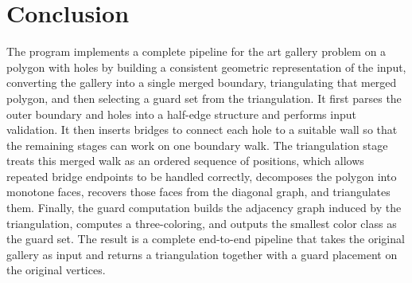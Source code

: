 \documentclass[11pt]{article}
\begin{document}
\section{Conclusion}

The program implements a complete pipeline for the art gallery problem on a polygon with holes by building a consistent geometric representation of the input, converting the gallery into a single merged
boundary, triangulating that merged polygon, and then selecting a guard set from the triangulation. It first parses the outer boundary and holes into a half-edge structure and performs input validation. It
then inserts bridges to connect each hole to a suitable wall so that the remaining stages can work on one boundary walk. The triangulation stage treats this merged walk as an ordered
sequence of positions, which allows repeated bridge endpoints to be handled correctly, decomposes the polygon into monotone faces, recovers those faces from the diagonal graph, and
triangulates them. Finally, the guard computation builds the adjacency graph induced by the triangulation, computes a three-coloring, and outputs the smallest color class as the
guard set. The result is a complete end-to-end pipeline that takes the original gallery as input and returns a triangulation together with a guard placement on the original
vertices.
\end{document}

